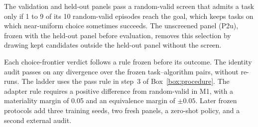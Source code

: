 The validation and held-out panels pass a random-valid screen that admits a task only if 1 to 9 of its 10 random-valid episodes reach the goal, which keeps tasks on which near-uniform choice sometimes succeeds. The unscreened panel (P2u), frozen with the held-out panel before evaluation, removes this selection by drawing kept candidates outside the held-out panel without the screen.

Each choice-frontier verdict follows a rule frozen before its outcome. The identity audit passes on any divergence over the frozen task--algorithm pairs, without re-runs. The ladder uses the pass rule in step~3 of Box~\ref{box:procedure}. The adapter rule requires a positive difference from random-valid in M1, with a materiality margin of 0.05 and an equivalence margin of $\pm 0.05$. Later frozen protocols add three training seeds, two fresh panels, a zero-shot policy, and a second external audit.

